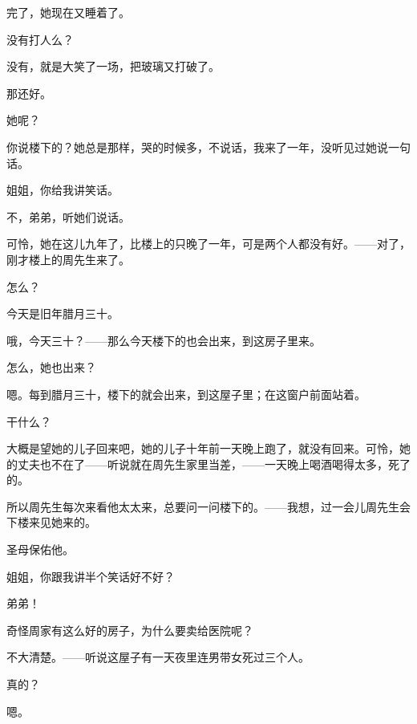 完了，她现在又睡着了。

没有打人么？

没有，就是大笑了一场，把玻璃又打破了。

那还好。

她呢？

你说楼下的？她总是那样，哭的时候多，不说话，我来了一年，没听见过她说一句话。

姐姐，你给我讲笑话。

不，弟弟，听她们说话。

可怜，她在这儿九年了，比楼上的只晚了一年，可是两个人都没有好。——对了，刚才楼上的周先生来了。

怎么？

今天是旧年腊月三十。

哦，今天三十？——那么今天楼下的也会出来，到这房子里来。

怎么，她也出来？

嗯。每到腊月三十，楼下的就会出来，到这屋子里；在这窗户前面站着。

干什么？

大概是望她的儿子回来吧，她的儿子十年前一天晚上跑了，就没有回来。可怜，她的丈夫也不在了——听说就在周先生家里当差，——一天晚上喝酒喝得太多，死了的。

所以周先生每次来看他太太来，总要问一问楼下的。——我想，过一会儿周先生会下楼来见她来的。

圣母保佑他。

姐姐，你跟我讲半个笑话好不好？

弟弟！

奇怪周家有这么好的房子，为什么要卖给医院呢？

不大清楚。——听说这屋子有一天夜里连男带女死过三个人。

真的？

嗯。

